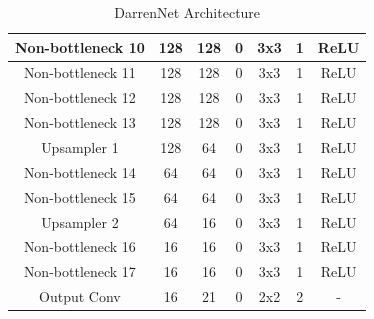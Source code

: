 \begin{table}[H]
\begin{tabular}{|c|c|c|c|c|c|c|}
		Non-bottleneck 10 & 128         & 128          & 0                & 3x3             & 1               & ReLU                \\ \hline
		Non-bottleneck 11 & 128         & 128          & 0                & 3x3             & 1               & ReLU                \\ \hline
		Non-bottleneck 12 & 128         & 128          & 0                & 3x3             & 1               & ReLU                \\ \hline
		Non-bottleneck 13 & 128         & 128          & 0                & 3x3             & 1               & ReLU                \\ \hline
		Upsampler 1       & 128         & 64           & 0                & 3x3             & 1               & ReLU                \\ \hline
		Non-bottleneck 14 & 64          & 64           & 0                & 3x3             & 1               & ReLU                \\ \hline
		Non-bottleneck 15 & 64          & 64           & 0                & 3x3             & 1               & ReLU                \\ \hline
		Upsampler 2       & 64          & 16           & 0                & 3x3             & 1               & ReLU                \\ \hline
		Non-bottleneck 16 & 16          & 16           & 0                & 3x3             & 1               & ReLU                \\ \hline
		Non-bottleneck 17 & 16          & 16           & 0                & 3x3             & 1               & ReLU                \\ \hline
		Output Conv       & 16          & 21           & 0                & 2x2             & 2               & -                   \\ \hline
	\end{tabular}
	\caption{DarrenNet Architecture}
\end{table}

